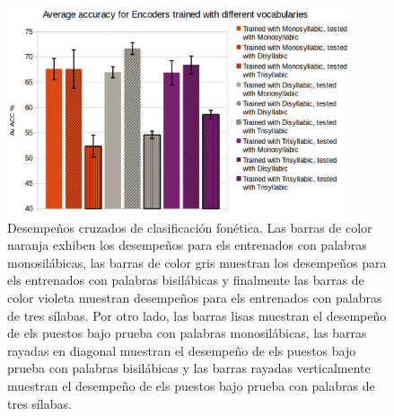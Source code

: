 \begin{figure}[h!]
    \centering
    \includegraphics[width=0.9\textwidth]{Encoder_Swept2.png}
    \caption{Desempe\~nos cruzados de clasificación fonética. Las barras de color naranja exhiben los desempe\~nos para \glspl{el} entrenados con palabras monosilábicas, las barras de color gris muestran los desempe\~nos para \glspl{el} entrenados con palabras bisilábicas y finalmente las barras de color violeta muestran desempeños para \glspl{el} entrenados con palabras de tres sílabas. Por otro lado, las barras lisas muestran el desempe\~no de \glspl{el} puestos bajo prueba con palabras monosilábicas, las barras rayadas en diagonal muestran el desempe\~no de \glspl{el} puestos bajo prueba con palabras bisilábicas y las barras rayadas verticalmente muestran el desempe\~no de \glspl{el} puestos bajo prueba con palabras de tres sílabas.}
    \label{fig:E_S2}
\end{figure}


